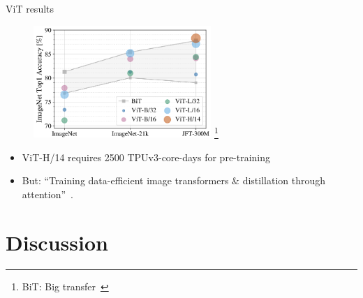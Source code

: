 \documentclass[xcolor=pdftex,dvipsnames,table,mathserif]{beamer}
\begin{document}






\begin{frame}{ViT results}

\begin{figure}[ht]
  \centering
  \includegraphics[width=0.6\textwidth]{vit_graph}
  \footnote{BiT: Big transfer~\cite{kolesnikov_big_2020}}
\end{figure}



\begin{itemize}
  \item ViT-H/14 requires 2500 TPUv3-core-days for pre-training
  \item But: ``Training data-efficient image transformers \& distillation through attention''~\cite{touvron_training_2021}.

\end{itemize}

\end{frame}



\section{Discussion}
\end{document}
